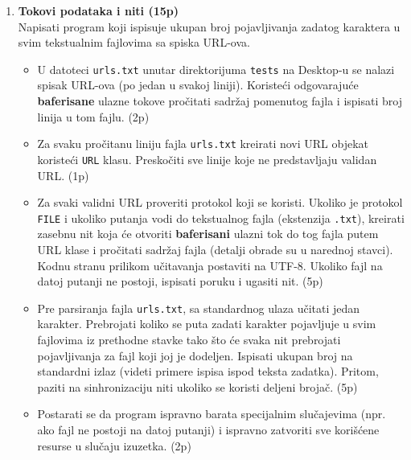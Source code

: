 \documentclass[]{article}
\begin{document}
\begin{enumerate}

  \item \textbf{Tokovi podataka i niti (15p)}
  \\Napisati program koji ispisuje ukupan broj pojavljivanja zadatog karaktera u svim tekstualnim fajlovima sa spiska URL-ova. 
  \begin{itemize}
    \item U datoteci \texttt{urls.txt} unutar direktorijuma \texttt{tests} na Desktop-u se nalazi spisak URL-ova (po jedan u svakoj liniji). Koriste\'c{}i odgovaraju\'c{}e \textbf{baferisane} ulazne tokove pro\v{c}itati sadr\v{z}aj pomenutog fajla i ispisati broj linija u tom fajlu. \hfill (2p)
    \item Za svaku pro\v{c}itanu liniju fajla \texttt{urls.txt} kreirati novi URL objekat koriste\'c{}i \texttt{URL} klasu. Presko\v{c}iti sve linije koje ne predstavljaju validan URL. \hfill (1p)
    \item Za svaki validni URL proveriti protokol koji se koristi. Ukoliko je protokol \texttt{FILE} i ukoliko putanja vodi do tekstualnog fajla (ekstenzija \texttt{.txt}), kreirati zasebnu nit koja \'c{}e otvoriti \textbf{baferisani} ulazni tok do tog fajla putem URL klase i pro\v{c}itati sadr\v{z}aj fajla (detalji obrade su u narednoj stavci). Kodnu stranu prilikom u\v{c}itavanja postaviti na UTF-8. Ukoliko fajl na datoj putanji ne postoji, ispisati poruku i ugasiti nit. \hfill (5p)
    \item Pre parsiranja fajla \texttt{urls.txt}, sa standardnog ulaza u\v{c}itati jedan karakter. Prebrojati koliko se puta zadati karakter pojavljuje u svim fajlovima iz prethodne stavke tako \v{s}to \'c{}e svaka nit prebrojati pojavljivanja za fajl koji joj je dodeljen. Ispisati ukupan broj na standardni izlaz (videti primere ispisa ispod teksta zadatka). Pritom, paziti na sinhronizaciju niti ukoliko se koristi deljeni broja\v{c}. \hfill (5p)
    \item Postarati se da program ispravno barata specijalnim slu\v{c}ajevima (npr. ako fajl ne postoji na datoj putanji) i ispravno zatvoriti sve kori\v{s}\'c{}ene resurse u slu\v{c}aju izuzetka. \hfill (2p)
  \end{itemize}


\end{enumerate}
\end{document}
